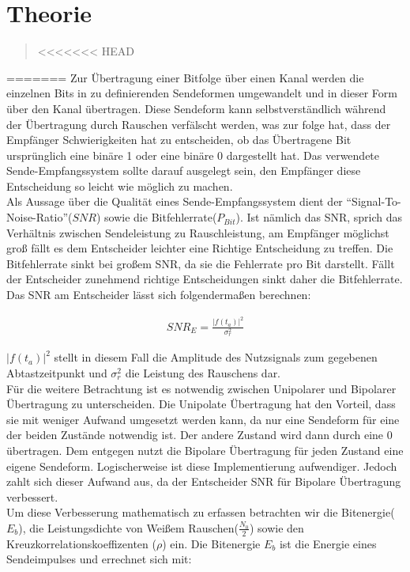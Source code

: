 \section{Theorie}
\begin{quote}
<<<<<<< HEAD

    
    
    \end{quote}%
=======
    Zur Übertragung einer Bitfolge über einen Kanal werden die einzelnen Bits in zu definierenden Sendeformen
    umgewandelt und in dieser Form über den Kanal übertragen. Diese Sendeform kann selbstverständlich während der
    Übertragung durch Rauschen verfälscht werden, was zur folge hat, dass der Empfänger Schwierigkeiten hat zu
    entscheiden, ob das Übertragene Bit ursprünglich eine binäre 1 oder eine  binäre 0 dargestellt hat. Das verwendete
    Sende-Empfangssystem sollte darauf ausgelegt sein, den Empfänger diese Entscheidung so leicht wie möglich zu
    machen.\\
    Als Aussage über die Qualität eines Sende-Empfangssystem dient der ``Signal-To-Noise-Ratio''($SNR$) sowie die
    Bitfehlerrate($P_{Bit}$). Ist nämlich das SNR, sprich das Verhältnis zwischen Sendeleistung zu Rauschleistung, am
    Empfänger möglichst groß fällt es dem Entscheider leichter eine Richtige Entscheidung zu treffen. Die Bitfehlerrate
    sinkt bei großem SNR, da sie die Fehlerrate pro Bit darstellt. Fällt der Entscheider zunehmend richtige
    Entscheidungen sinkt daher die Bitfehlerrate.\\
    Das SNR am Entscheider lässt sich folgendermaßen berechnen:
    
    \begin{equation*}
    	\begin{split}
    		SNR_E = \frac{|f(t_a)|^2}{\sigma_r^2}
    	\end{split}
    \end{equation*}
    
    $|f(t_a)|^2$ stellt in diesem Fall die Amplitude des Nutzsignals zum gegebenen Abtastzeitpunkt und $\sigma_r^2$ die
    Leistung des Rauschens dar.\\
    
    Für die weitere Betrachtung ist es notwendig zwischen Unipolarer und Bipolarer Übertragung zu unterscheiden. Die
    Unipolate Übertragung hat den Vorteil, dass sie mit weniger Aufwand umgesetzt werden kann, da nur eine Sendeform für
    eine der beiden Zustände notwendig ist. Der andere Zustand wird dann durch eine 0 übertragen. Dem entgegen nutzt die
    Bipolare Übertragung für jeden Zustand eine eigene Sendeform. Logischerweise ist diese Implementierung aufwendiger.
    Jedoch zahlt sich dieser Aufwand aus, da der Entscheider SNR für Bipolare Übertragung verbessert.\\
    Um diese Verbesserung mathematisch zu erfassen betrachten wir die Bitenergie($E_b$), die Leistungsdichte von Weißem
    Rauschen($\frac{N_0}{2}$) sowie den Kreuzkorrelationskoeffizenten ($\rho$) ein. Die Bitenergie $E_b$ ist die Energie
    eines Sendeimpulses und errechnet sich mit: \cite{Bitenergie}
    
